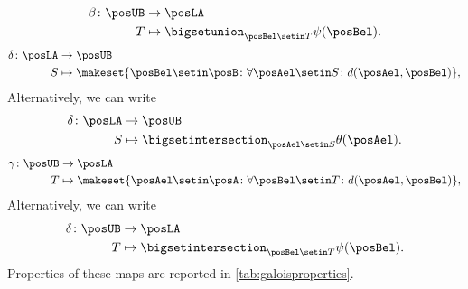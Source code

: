 \begin{equation}
    \begin{aligned}
        \beta \colon \posUB & \to \posLA \\
        T                   & \mapsto \bigsetunion_{\posBel\setin T} \psi(\posBel).
    \end{aligned}
\end{equation}
%
\begin{equation}
    \label{eq:galoisdelta}
    \begin{aligned}
        \delta \colon \posLA & \to \posUB \\
        S                    & \mapsto \makeset{\posBel\setin \posB \colon \forall {\posAel\setin S}\colon d(\posAel,\posBel)},
    \end{aligned}
\end{equation}
Alternatively, we can write
\begin{equation}
    \begin{aligned}
        \delta\colon \posLA & \to \posUB \\
        S                   & \mapsto \bigsetintersection_{\posAel\setin S}\theta(\posAel).
    \end{aligned}
\end{equation}
%
\begin{equation}
    \label{eq:galoisgamma}
    \begin{aligned}
        \gamma \colon \posUB & \to \posLA \\
        T                    & \mapsto \makeset{\posAel\setin \posA \colon \forall {\posBel\setin T}\colon d(\posAel,\posBel)},
    \end{aligned}
\end{equation}
Alternatively, we can write
\begin{equation}
    \begin{aligned}
        \delta\colon \posUB & \to \posLA \\
        T                   & \mapsto \bigsetintersection_{\posBel\setin T}\psi(\posBel).
    \end{aligned}
\end{equation}
%
Properties of these maps are reported in \cref{tab:galoisproperties}.

